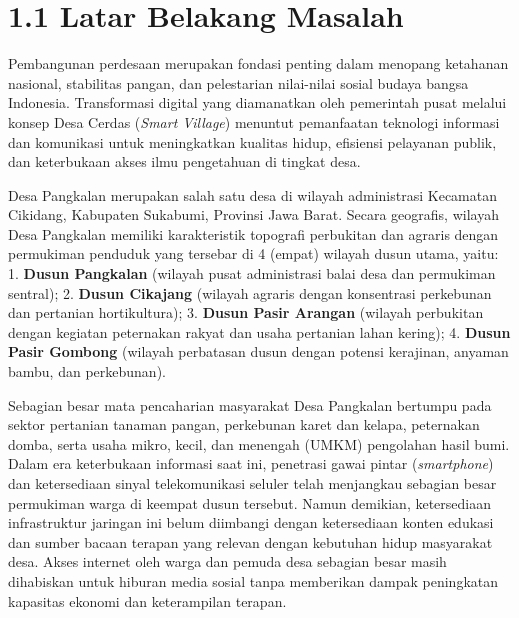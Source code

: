 \documentclass[
  indonesian,
  12pt,
]{report}
\begin{document}
\section{1.1 Latar Belakang Masalah}\label{latar-belakang-masalah}

Pembangunan perdesaan merupakan fondasi penting dalam menopang ketahanan
nasional, stabilitas pangan, dan pelestarian nilai-nilai sosial budaya
bangsa Indonesia. Transformasi digital yang diamanatkan oleh pemerintah
pusat melalui konsep Desa Cerdas (\emph{Smart Village}) menuntut
pemanfaatan teknologi informasi dan komunikasi untuk meningkatkan
kualitas hidup, efisiensi pelayanan publik, dan keterbukaan akses ilmu
pengetahuan di tingkat desa.

Desa Pangkalan merupakan salah satu desa di wilayah administrasi
Kecamatan Cikidang, Kabupaten Sukabumi, Provinsi Jawa Barat. Secara
geografis, wilayah Desa Pangkalan memiliki karakteristik topografi
perbukitan dan agraris dengan permukiman penduduk yang tersebar di 4
(empat) wilayah dusun utama, yaitu: 1. \textbf{Dusun Pangkalan} (wilayah
pusat administrasi balai desa dan permukiman sentral); 2. \textbf{Dusun
Cikajang} (wilayah agraris dengan konsentrasi perkebunan dan pertanian
hortikultura); 3. \textbf{Dusun Pasir Arangan} (wilayah perbukitan
dengan kegiatan peternakan rakyat dan usaha pertanian lahan kering); 4.
\textbf{Dusun Pasir Gombong} (wilayah perbatasan dusun dengan potensi
kerajinan, anyaman bambu, dan perkebunan).

Sebagian besar mata pencaharian masyarakat Desa Pangkalan bertumpu pada
sektor pertanian tanaman pangan, perkebunan karet dan kelapa, peternakan
domba, serta usaha mikro, kecil, dan menengah (UMKM) pengolahan hasil
bumi. Dalam era keterbukaan informasi saat ini, penetrasi gawai pintar
(\emph{smartphone}) dan ketersediaan sinyal telekomunikasi seluler telah
menjangkau sebagian besar permukiman warga di keempat dusun tersebut.
Namun demikian, ketersediaan infrastruktur jaringan ini belum diimbangi
dengan ketersediaan konten edukasi dan sumber bacaan terapan yang
relevan dengan kebutuhan hidup masyarakat desa. Akses internet oleh
warga dan pemuda desa sebagian besar masih dihabiskan untuk hiburan
media sosial tanpa memberikan dampak peningkatan kapasitas ekonomi dan
keterampilan terapan.
\end{document}
